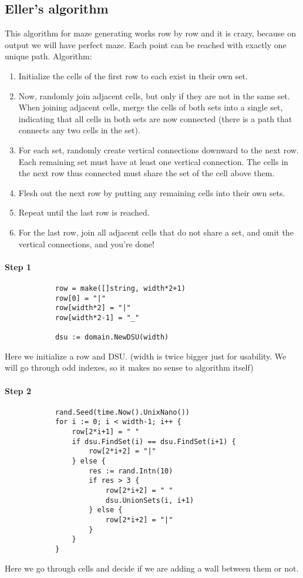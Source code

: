 		\subsection{Eller's algorithm}
		This algorithm for maze generating works row by row and it is crazy, because on output we will have perfect maze. Each point can be reached with exactly one unique path.
		Algorithm:
		
		\begin{enumerate}
			\item Initialize the cells of the first row to each exist in their own set.
			\item Now, randomly join adjacent cells, but only if they are not in the same set. When joining adjacent cells, merge the cells of both sets into a single set, indicating that all cells in both sets are now connected (there is a path that connects any two cells in the set).
			\item For each set, randomly create vertical connections downward to the next row. Each remaining set must have at least one vertical connection. The cells in the next row thus connected must share the set of the cell above them.
			\item Flesh out the next row by putting any remaining cells into their own sets.
			\item Repeat until the last row is reached.
			\item For the last row, join all adjacent cells that do not share a set, and omit the vertical connections, and you’re done!
		\end{enumerate}
		
		\paragraph{Step 1}
		
		\begin{lstlisting}
			row = make([]string, width*2+1)
			row[0] = "|"
			row[width*2] = "|"
			row[width*2-1] = "_"

			dsu := domain.NewDSU(width)
		\end{lstlisting}
		
		Here we initialize a row and DSU. (width is twice bigger just for usability. We will go through odd indexes, so it makes no sense to algorithm itself)
		
		\paragraph{Step 2}
		\begin{lstlisting}
			rand.Seed(time.Now().UnixNano())
			for i := 0; i < width-1; i++ {
				row[2*i+1] = " "
				if dsu.FindSet(i) == dsu.FindSet(i+1) {
					row[2*i+2] = "|"
				} else {
					res := rand.Intn(10)
					if res > 3 {
						row[2*i+2] = " "
						dsu.UnionSets(i, i+1)
					} else {
						row[2*i+2] = "|"
					}
				}
			}
		\end{lstlisting}
		Here we go through cells and decide if we are adding a wall between them or not.
		

